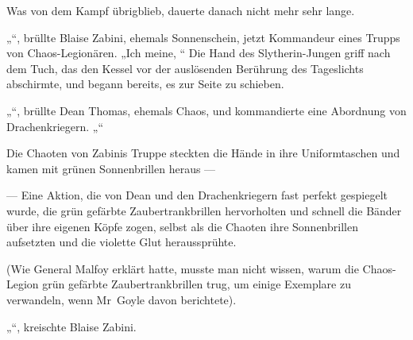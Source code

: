 Was von dem Kampf übrigblieb, dauerte danach nicht mehr sehr lange.

\later

„“, brüllte Blaise Zabini, ehemals Sonnenschein, jetzt Kommandeur eines Trupps von Chaos-Legionären.
„Ich meine, “ Die Hand des Slytherin-Jungen griff nach dem Tuch, das den Kessel vor der auslösenden Berührung des Tageslichts abschirmte, und begann bereits, es zur Seite zu schieben.

„“, brüllte Dean Thomas, ehemals Chaos, und kommandierte eine Abordnung von Drachenkriegern.
„“

Die Chaoten von Zabinis Truppe steckten die Hände in ihre Uniformtaschen und kamen mit grünen Sonnenbrillen heraus —

— Eine Aktion, die von Dean und den Drachenkriegern fast perfekt gespiegelt wurde, die grün gefärbte Zaubertrankbrillen hervorholten und schnell die Bänder über ihre eigenen Köpfe zogen, selbst als die Chaoten ihre Sonnenbrillen aufsetzten und die violette Glut heraussprühte.

(Wie General Malfoy erklärt hatte, musste man nicht wissen, warum die Chaos-Legion grün gefärbte Zaubertrankbrillen trug, um einige Exemplare zu verwandeln, wenn Mr~Goyle davon berichtete).

„“, kreischte Blaise Zabini.

